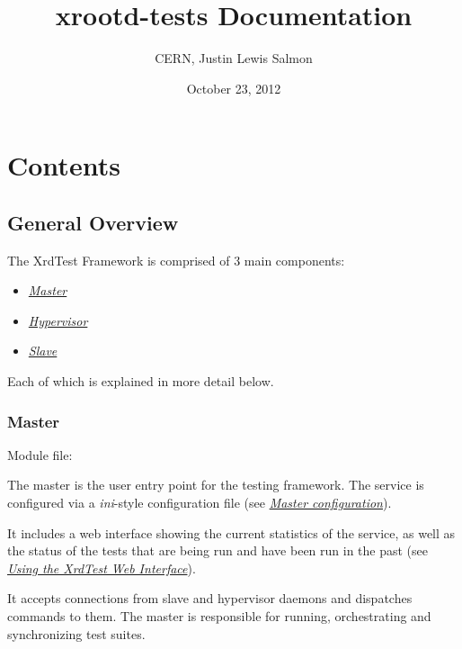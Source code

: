 \documentclass[a4paper,11pt,openany]{sphinxmanual}
\title{xrootd-tests Documentation}
\date{October 23, 2012}
\author{CERN, Justin Lewis Salmon}
\begin{document}
\maketitle
\tableofcontents
{}\label{index::doc}



\chapter{Contents}
\label{index:contents}\label{index:xrdtest-framework-release-documentation}

\section{General Overview}
\label{general-overview:general-overview}\label{general-overview::doc}
The XrdTest Framework is comprised of 3 main components:
\begin{itemize}
\item {} 
{\hyperref[general-overview:master]{\emph{Master}}}

\item {} 
{\hyperref[general-overview:hypervisor]{\emph{Hypervisor}}}

\item {} 
{\hyperref[general-overview:slave]{\emph{Slave}}}

\end{itemize}

Each of which is explained in more detail below.


\subsection{Master}
\label{general-overview:master}\label{general-overview:id1}
Module file: 

The master is the user entry point for the testing framework. The service is
configured via a \emph{ini}-style configuration file (see {\hyperref[config-master::doc]{\emph{Master configuration}}}).

It includes a web interface showing the current statistics of the service,
as well as the status of the tests that are being run and have been run in the
past (see {\hyperref[web-interface::doc]{\emph{Using the XrdTest Web Interface}}}).

It accepts connections from slave and hypervisor daemons and dispatches commands
to them. The master is responsible for running,  orchestrating and synchronizing
test suites.
\end{document}
